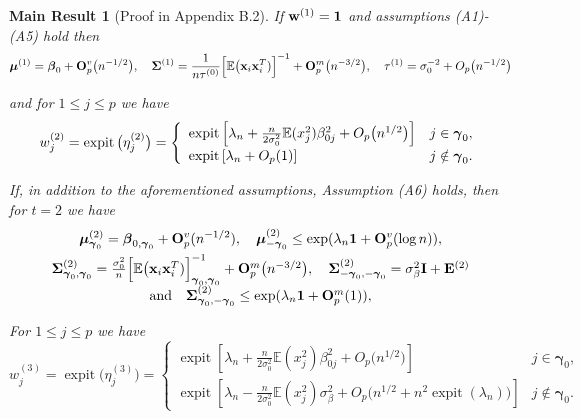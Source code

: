 \documentclass[11pt]{article}
\newtheorem{Main Result}{Main Result}
\def\vectorfontone{\bf}
\def\vectorfonttwo{\boldsymbol}
\def\vw{{\vectorfontone w}}                      %
\def\vx{{\vectorfontone x}}                      %
\def\vone{{\vectorfontone 1}}
\def\vbeta{{\vectorfonttwo \beta}}               %
\def\vgamma{{\vectorfonttwo \gamma}}             %
\def\vmu{{\vectorfonttwo \mu}}                   %
\def\matrixfontone{\bf}
\def\matrixfonttwo{\boldsymbol}
\def\mE{{\matrixfontone E}}                      %
\def\mI{{\matrixfontone I}}                      %
\def\mO{{\matrixfontone O}}                      %
\def\mSigma{{\matrixfonttwo \Sigma}}             %
\def\bE{{\mathbb E}}                             %
\def\ds{\displaystyle}
\DeclareMathOperator{\expit}{expit}
\newcommand{\cyc}[1]{{\color{black}#1}}
\begin{document}
\begin{Main Result}[Proof in Appendix B.2]\label{mres:2}
	If $\vw^{(1)}=\vone$  and assumptions (A1)-(A5) hold then
	\begin{equation}\label{eq:final1}
	\ds \vmu^{(1)}  = \vbeta_0 + \mO^v_p\big(n^{-1/2}\big),
	\quad\mSigma^{(1)} =\cyc{\frac{1}{n\tau^{(0)}}}\Big[\bE\big(\vx_i\vx_i^T)\Big]^{-1}+\mO_p^m\big(n^{-3/2}\big),
	\quad\tau^{(1)}=\sigma_0^{-2} + O_p\big(n^{-1/2}\big)
	\end{equation}
	
	\noindent and for $1\le j\le p$ we have
	\begin{equation}\label{eq:final2}
	\ds\ds w_j^{(2)} = \expit\big(\eta_j^{(2)}\big)=\left\{ \begin{array}{ll}
	\expit\left[\lambda_n+ \frac{n}{2\sigma^2_0}\bE (x_j^2)\beta_{0j}^2 + O_p\big(n^{1/2}\big)\right] & j\in\vgamma_0, \\ [1ex]
	\expit\left[\lambda_n+O_p(1)\right]    & j\notin\vgamma_0.
	\end{array}\right.
	\end{equation}
	
	\noindent If, in addition to the aforementioned assumptions,
	Assumption (A6) holds, then for $t=2$ we have
	\begin{equation}\label{eq:final3}
	\begin{array}{c}
	\ds \vmu_{\vgamma_0}^{(2)}  = \vbeta_{0,\vgamma_0} + \mO_p^v(n^{-1/2}),
	\quad
	\cyc{\vmu_{-\vgamma_0}^{(2)} \leq \exp(\lambda_n\mathbf{1} + \mO_p^v(\log n) )},
	\\ [1ex]
	\mSigma_{\vgamma_0,\vgamma_0}^{(2)} =\frac{\sigma_0^2}{n}\Big[\bE\big(\vx_i\vx_i^T)\Big]_{\vgamma_0,\vgamma_0}^{-1}+\mO_p^m\big(n^{-3/2}\big),
	\quad
	\cyc{\mSigma_{-\vgamma_0,-\vgamma_0}^{(2)}  = \sigma_\beta^2\mI + \mE^{(2)}} \\ [1ex]
	\mbox{and}\quad \cyc{\mSigma_{\vgamma_0,-\vgamma_0}^{(2)}  \leq \exp(\lambda_n\mathbf{1} + \mO_p^m(1))},
	\end{array}
	\end{equation}
	
	\noindent \cyc{where $\mE^{(2)}\leq  \exp(\lambda_n\mathbf{1} + \mO_p^m(\log n))$.} For $1\le j\le p$ we have
	\begin{equation}\label{eq:final4}
	\ds w_j^{(3)} = \expit\big(\eta_j^{(3)}\big)=\left\{ \begin{array}{ll}
	\expit\left[\lambda_n+ \frac{n}{2\sigma^2_0}\bE (x_j^2)\beta_{0j}^2 + O_p\big(n^{1/2}\big)\right] & j\in\vgamma_0,
	\\ [1ex]
	\expit\left[ \lambda_n - \frac{n}{2\sigma^2_0}\bE (x_j^2)\sigma^2_\beta+O_p\big(n^{1/2}+n^2\expit(\lambda_n)) \right]  & j\notin\vgamma_0.
	\end{array}\right.
	\end{equation}
	

\end{Main Result}
\end{document}
